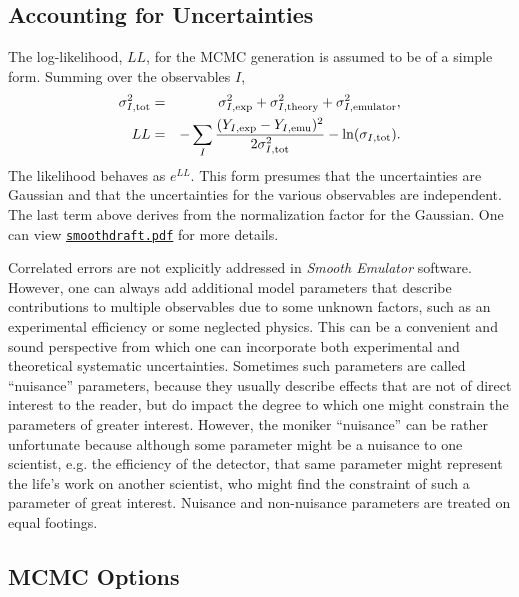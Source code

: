 \documentclass[UserManual.tex]{subfiles}
\begin{document}
\subsection{Accounting for Uncertainties}

The log-likelihood, $LL$, for the MCMC generation is assumed to be of a simple form. Summing over the observables $I$,
\begin{eqnarray*}
\sigma_{I,{\rm tot}}^{2}&=&\sigma_{I,{\rm exp}}^2+\sigma_{I,{\rm theory}}^2+\sigma_{I,{\rm emulator}}^2,\\
LL&=&-\sum_{I}\frac{(Y_{I,{\rm exp}}-Y_{I,{\rm emu}})^{2}}{2\sigma_{I,{\rm tot}}^{2}}-\ln(\sigma_{I,{\rm tot}}).
\end{eqnarray*}
The likelihood behaves as $e^{LL}$. This form presumes that the uncertainties are Gaussian and that the uncertainties for the various observables are independent. The last term above derives from the normalization factor for the Gaussian. One can view \href{smoothdraft.pdf}{\tt smoothdraft.pdf} for more details.

Correlated errors are not explicitly addressed in {\it Smooth Emulator} software. However, one can always add additional model parameters that describe contributions to multiple observables due to some unknown factors, such as an experimental efficiency or some neglected physics. This can be a convenient and sound perspective from which one can incorporate both experimental and theoretical systematic uncertainties. Sometimes such parameters are called ``nuisance'' parameters, because they usually describe effects that are not of direct interest to the reader, but do impact the degree to which one might constrain the parameters of greater interest. However, the moniker ``nuisance'' can be rather unfortunate  because although some parameter might be a nuisance to one scientist, e.g. the efficiency of the detector, that same parameter might represent the life's work on another scientist, who might find the constraint of such a parameter of great interest. Nuisance and non-nuisance parameters are treated on equal footings.

\subsection{MCMC Options}
\end{document}
